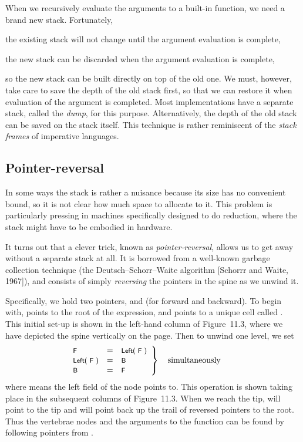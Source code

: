 When we recursively evaluate the arguments to a built-in function, we need
a brand new stack. Fortunately,
\begin{numbered}
    \item the existing stack will not change until the argument evaluation is
    complete,
    \item the new stack can be discarded when the argument evaluation is
    complete,
\end{numbered}
so the new stack can be built directly on top of the old one. We must, however,
take care to save the depth of the old stack first, so that we can restore it when
evaluation of the argument is completed. Most implementations have a
separate stack, called the \textit{dump}, for this purpose. Alternatively, the depth of
the old stack can be saved on the stack itself. This technique is rather
reminiscent of the \textit{stack frames} of imperative languages.

\subsection{Pointer-reversal}

In some ways the stack is rather a nuisance because its size has no convenient
bound, so it is not clear how much space to allocate to it. This problem is
particularly pressing in machines specifically designed to do reduction, where
the stack might have to be embodied in hardware.

It turns out that a clever trick, known as \textit{pointer-reversal}, allows us to get
away without a separate stack at all. It is borrowed from a well-known
garbage collection technique (the Deutsch–Schorr–Waite algorithm
[Schorrr and Waite, 1967]), and consists of simply \textit{reversing} the pointers in the spine as
we unwind it.

Specifically, we hold two pointers,  and  (for forward and backward). To
begin with,  points to the root of the expression, and  points to a unique cell
called . This initial set-up is shown in the left-hand column of Figure~11.3,
where we have depicted the spine vertically on the page. Then to unwind one
level, we set
\[\hspace{-.75cm}
\left.
\begin{array}{lcl}
    \text{\ml{F}}       & = & \text{\ml{Left( F )}} \\
    \text{\ml{Left( F )}} & = & \text{\ml{B}}       \\
    \text{\ml{B}}       & = & \text{\ml{F}}
\end{array}
\right\}
\quad \text{simultaneously}
\]
\noindent
where  means the left field of the node  points to. This operation is
shown taking place in the subsequent columns of Figure~11.3. When we reach
the tip,  will point to the tip and  will point back up the trail of reversed
pointers to the root. Thus the vertebrae nodes and the arguments to the
function can be found by following pointers from .

